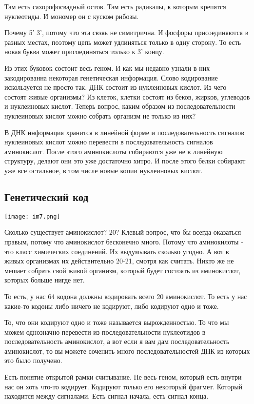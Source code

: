 Там есть сахорофосвадный остов. Там есть радикалы, к которым крепятся 
нуклеотиды. И мономер он с куском рибозы. 

Почему 5' 3', потому что эта свзяь не симитрична. И фосфоры присоединяются в разных 
местах, поэтому цепь может удлиняться только в одну сторону. То есть новая буква 
может присоединяться только к 3' концу.

Из этих буковок состоит весь геном. И как мы недавно узнали в них
закодированна некоторая генетическая информация. Слово кодирование искользуется
не просто так. ДНК состоит из нуклеиновых кислот. Из чего состоят живые организмы?
Из клеток, клетки состоят из беков, жирков, углеводов и нуклеиновых кислот. Теперь вопрос,
каким образом из последовательности
нуклеиновых кислот можно собрать организм не только из них?

В ДНК информация хранится в линейной форме и последовательность сигналов
нуклеиновых кислот можно перевести в последовательность сигналов
аминокислот. После этого аминокислоты собираются уже не в линейную структуру,
делают они это уже достаточно хитро. И после этого белки собирают
уже все остальное, в том числе новые копии нуклеиновых кислот.

  
\subsection{Генетический код}
\texttt{[image: im7.png]}

Сколько существует аминокислот?
20?
Клевый вопрос, что бы всегда оказаться правым, потому что
аминокислот бесконечно много. Потому что аминокилоты - это
класс химических соединений. Их выдумывать сколько угодно.
А вот в живых организмах их действительно 20-21, смотря как 
считать. Никто же не мешает собрать свой живой организм, 
который будет состоять из аминокислот, которых больше нигде нет. 

То есть, у нас 64 кодона должны кодировать всего 20 аминокислот. 
То есть у нас какие-то кодоны либо ничего не кодируют, 
либо кодируют одно и тоже. 

То, что они кодируют одно и тоже называется вырожденностью. 
То что мы можем однозначно перевести из последовательности 
нуклеотидов в последовательность аминокислот, 
а вот если я вам дам последовательность аминокислот, 
то вы можете соченить много 
последовательностей ДНК из которых это было получено. 

Есть понятие открытой рамки считывание. Не весь 
геном, который есть внутри нас он хоть что-то кодирует. 
Кодируют только его некоторый фрагмет. Который 
находится между сигналами. Есть сигнал начала, 
есть сигнал конца. 

